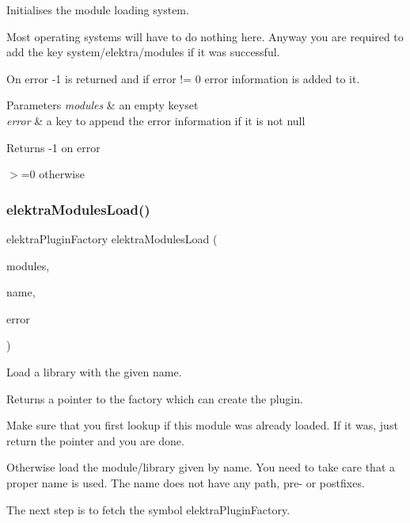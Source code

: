Initialises the module loading system. 

Most operating systems will have to do nothing here. Anyway you are required to add the key system/elektra/modules if it was successful.

On error -\/1 is returned and if error != 0 error information is added to it.


\begin{DoxyParams}{Parameters}
{\em modules} & an empty keyset \\
\hline
{\em error} & a key to append the error information if it is not null \\
\hline
\end{DoxyParams}
\begin{DoxyReturn}{Returns}
-\/1 on error 

$>$=0 otherwise 
\end{DoxyReturn}
\mbox{\label{group__modules_ga09300fbf0e0cfc9dc80bb877b00117c0}} 
\subsubsection{\texorpdfstring{elektraModulesLoad()}{elektraModulesLoad()}}
{\footnotesize\ttfamily elektra\+Plugin\+Factory elektra\+Modules\+Load (\begin{DoxyParamCaption}\item[{Key\+Set $\ast$}]{modules,  }\item[{const char $\ast$}]{name,  }\item[{Key $\ast$}]{error }\end{DoxyParamCaption})}



Load a library with the given name. 

\begin{DoxyReturn}{Returns}
a pointer to the factory which can create the plugin.
\end{DoxyReturn}
Make sure that you first lookup if this module was already loaded. If it was, just return the pointer and you are done.

Otherwise load the module/library given by name. You need to take care that a proper name is used. The name does not have any path, pre-\/ or postfixes.

The next step is to fetch the symbol elektra\+Plugin\+Factory.

